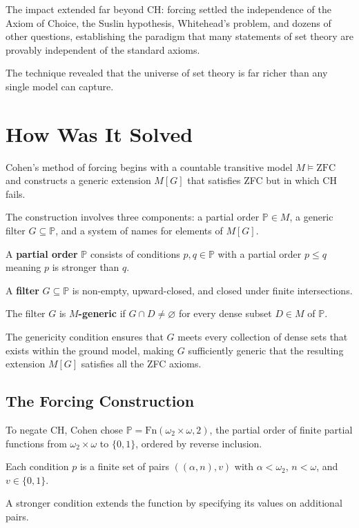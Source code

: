 The impact extended far beyond CH: forcing settled the independence of the Axiom of Choice, the Suslin hypothesis, Whitehead's problem, and dozens of other questions, establishing the paradigm that many statements of set theory are provably independent of the standard axioms.

The technique revealed that the universe of set theory is far richer than any single model can capture.

\section{How Was It Solved}

Cohen's method of forcing begins with a countable transitive model $M \models \text{ZFC}$ and constructs a generic extension $M[G]$ that satisfies ZFC but in which CH fails.

The construction involves three components: a partial order $\mathbb{P} \in M$, a generic filter $G \subseteq \mathbb{P}$, and a system of names for elements of $M[G]$.

A \textbf{partial order} $\mathbb{P}$ consists of conditions $p, q \in \mathbb{P}$ with a partial order $p \leq q$ meaning $p$ is stronger than $q$.

A \textbf{filter} $G \subseteq \mathbb{P}$ is non-empty, upward-closed, and closed under finite intersections.

The filter $G$ is \textbf{$M$-generic} if $G \cap D \neq \varnothing$ for every dense subset $D \in M$ of $\mathbb{P}$.

The genericity condition ensures that $G$ meets every collection of dense sets that exists within the ground model, making $G$ sufficiently generic that the resulting extension $M[G]$ satisfies all the ZFC axioms.

\subsection*{The Forcing Construction}

To negate CH, Cohen chose $\mathbb{P} = \text{Fn}(\omega_2 \times \omega, 2)$, the partial order of finite partial functions from $\omega_2 \times \omega$ to $\{0,1\}$, ordered by reverse inclusion.

Each condition $p$ is a finite set of pairs $((\alpha, n), v)$ with $\alpha < \omega_2$, $n < \omega$, and $v \in \{0,1\}$.

A stronger condition extends the function by specifying its values on additional pairs.

